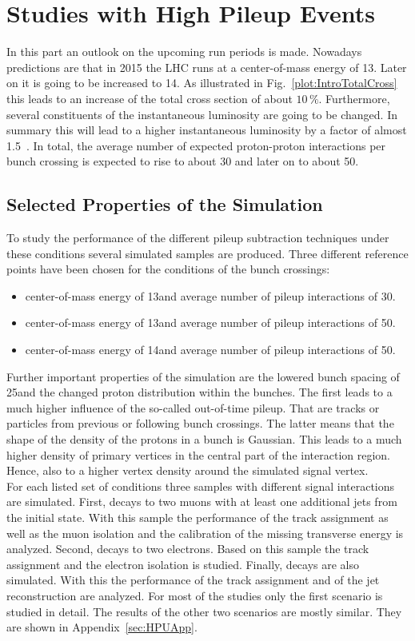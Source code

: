 \chapter{Studies with High Pileup Events \label{sec:HPU}}

In this part an outlook on the upcoming run periods is made. Nowadays predictions are that in 2015 the LHC runs at a center-of-mass energy of 13\TeV. Later on it is going to be increased to 14\TeV. As illustrated in Fig.~\ref{plot:IntroTotalCross} this leads to an increase of the total cross section of about $10\,\%$. Furthermore, several constituents of the instantaneous luminosity are going to be changed. In summary this will lead to a higher instantaneous luminosity by a factor of almost 1.5~\cite{LHCUpgrade}. In total, the average number of expected proton-proton interactions per bunch crossing is expected to rise to about 30 and later on to about 50.

\section{Selected Properties of the Simulation \label{sec:HPUSim}}

To study the performance of the different pileup subtraction techniques under these conditions several simulated samples are produced. Three different reference points have been chosen for the conditions of the bunch crossings:
\begin{itemize}
\item center-of-mass energy of 13\TeV and average number of pileup interactions of 30.
\item center-of-mass energy of 13\TeV and average number of pileup interactions of 50.
\item center-of-mass energy of 14\TeV and average number of pileup interactions of 50.
\end{itemize}
Further important properties of the simulation are the lowered bunch spacing of 25\ns and the changed proton distribution within the bunches. The first leads to a much higher influence of the so-called out-of-time pileup. That are tracks or particles from previous or following bunch crossings. The latter means that the shape of the density of the protons in a bunch is Gaussian. This leads to a much higher density of primary vertices in the central part of the interaction region. Hence, also to a higher vertex density around the simulated signal vertex. \\
For each listed set of conditions three samples with different signal interactions are simulated. First, \Zz decays to two muons with at least one additional jets from the initial state. With this sample the performance of the track assignment as well as the muon isolation and the calibration of the missing transverse energy \ETmiss is analyzed. Second, \Zz decays to two electrons. Based on this sample the track assignment and the electron isolation is studied. Finally, \ttbar decays are also simulated. With this the performance of the track assignment and of the jet reconstruction are analyzed. For most of the studies only the first scenario is studied in detail. The results of the other two scenarios are mostly similar. They are shown in Appendix~\ref{sec:HPUApp}.

